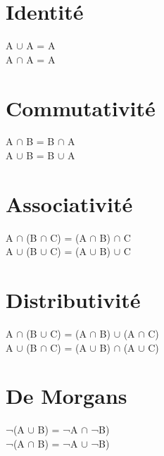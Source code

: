 \vspace{3mm} %
\section{Identité}
\vspace{3mm} %

A $\cup$ A = A \\
A $\cap$ A = A \\

\vspace{3mm} %
\section{Commutativité}
\vspace{3mm} %

A $\cap$ B  = B $\cap$ A \\
A $\cup$ B  = B $\cup$ A \\

\vspace{3mm} %
\section{Associativité}
\vspace{3mm} %

A $\cap$ (B $\cap$ C) = (A $\cap$ B) $\cap$ C \\
A $\cup$ (B $\cup$ C) = (A $\cup$ B) $\cup$ C \\

\vspace{3mm} %
\section{Distributivité}
\vspace{3mm} %

A $\cap$ (B $\cup$ C) = (A $\cap$ B) $\cup$ (A $\cap$ C) \\
A $\cup$ (B $\cap$ C) = (A $\cup$ B) $\cap$ (A $\cup$ C) \\

\vspace{3mm} %
\section{De Morgans}
\vspace{3mm} %

¬(A $\cup$ B) = ¬A $\cap$ ¬B) \\
¬(A $\cap$ B) = ¬A $\cup$ ¬B) \\
